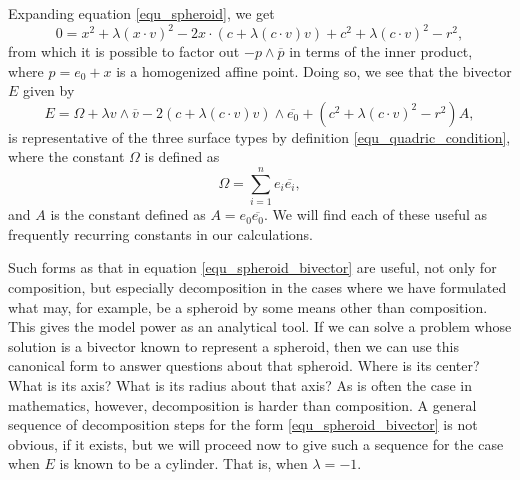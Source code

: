 \documentclass{birkjour}
\theoremstyle{definition}
\theoremstyle{remark}
\numberwithin{equation}{section}
\begin{document}
Expanding equation \eqref{equ_spheroid}, we get
\begin{equation}
0 = x^2 + \lambda(x\cdot v)^2 - 2x\cdot (c+\lambda(c\cdot v)v) + c^2 + \lambda(c\cdot v)^2 - r^2,
\end{equation}
from which it is possible to factor out $-p\wedge\overline{p}$
in terms of the inner product, where $p=e_0+x$
is a homogenized affine point.  Doing so, we see that the bivector
$E$ given by
\begin{equation}\label{equ_spheroid_bivector}
E = \Omega + \lambda v\wedge\overline{v} - 2(c+\lambda(c\cdot v)v)\wedge\overline{e_0} + (c^2+\lambda(c\cdot v)^2-r^2)A,
\end{equation}
is representative of the three surface types by definition \eqref{equ_quadric_condition}, where the constant
$\Omega$ is defined as
\begin{equation}
\Omega=\sum_{i=1}^n e_i\overline{e_i},
\end{equation}
and $A$ is the constant defined as $A=e_0\overline{e_0}$.  We will find each of these useful as
frequently recurring constants in our calculations.

Such forms as that in equation \eqref{equ_spheroid_bivector} are useful, not only
for composition, but especially decomposition in the cases
where we have formulated what may, for example, be a spheroid by some means
other than composition.
This gives the model power as an analytical tool.  If we can solve a problem whose solution
is a bivector known to represent a spheroid, then we can use this canonical form to answer
questions about that spheroid.  Where is its center?  What is its axis?  What is its radius
about that axis?  As is often the case in mathematics, however, decomposition is
harder than composition.  A general sequence of decomposition steps for the
form \eqref{equ_spheroid_bivector} is not obvious, if it exists, but we will
proceed now to give such a sequence for the case when $E$ is known
to be a cylinder.  That is, when $\lambda=-1$.
\end{document}

